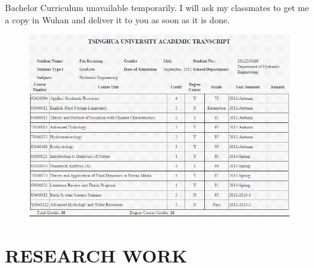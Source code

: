 \documentclass{res}
\begin{document}
\begin{resume}
Bachelor Curriculum unavailable temporarily. I will ask my classmates to get me a copy  in Wuhan and deliver it to you as soon as it is done.
\begin{figure}[htbp]
 \includegraphics[width=17cm]{master_scores.png}
\end{figure}


\section{RESEARCH WORK}


\end{resume}
\end{document}
